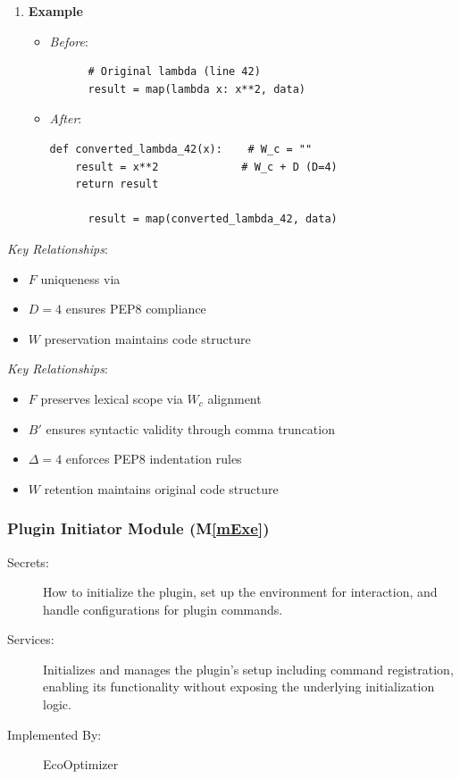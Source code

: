 \documentclass[12pt, titlepage]{article}
\newcommand{\mref}[1]{M\ref{#1}}
\begin{document}
\begin{enumerate}
  \item \textbf{Example}
  \begin{itemize}
      \item \textit{Before}:
      \begin{verbatim}
      # Original lambda (line 42)
      result = map(lambda x: x**2, data)
      \end{verbatim}
      
      \item \textit{After}:
      \begin{verbatim}
def converted_lambda_42(x):    # W_c = ""
    result = x**2             # W_c + D (D=4)
    return result

      result = map(converted_lambda_42, data)
      \end{verbatim}
  \end{itemize}
\end{enumerate}

\textit{Key Relationships}:
\begin{itemize}
    \item \( F \) uniqueness via 
    \item \( D = 4 \) ensures PEP8 compliance
    \item \( W \) preservation maintains code structure
\end{itemize}

\textit{Key Relationships}:
\begin{itemize}
    \item \( F \) preserves lexical scope via \( W_c \) alignment
    \item \( B' \) ensures syntactic validity through comma truncation
    \item \( \Delta = 4 \) enforces PEP8 indentation rules
    \item \( W \) retention maintains original code structure
\end{itemize}

\subsubsection{Plugin Initiator Module (\mref{mExe})}


\begin{description}
    \item[Secrets:] How to initialize the plugin, set up the environment for interaction, and handle configurations for plugin commands.
    \item[Services:] Initializes and manages the plugin's setup including command registration, enabling its functionality without exposing the underlying initialization logic.
    \item[Implemented By:] EcoOptimizer
\end{description}
\end{document}
